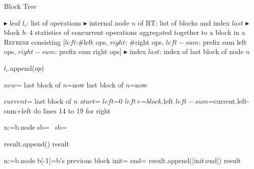 \documentclass[10pt,table]{article}
\theoremstyle{definition}
\begin{document}
\begin{algorithm}
\caption{Block Tree}
\begin{algorithmic}[1]
\begin{multicols}{2}


\Statex $\blacktriangleright$ leaf $l_i$: list of operations
\Statex $\blacktriangleright$ internal node $n$ of BT: list of blocks and index $last$
\Statex $\blacktriangleright$ block $b$: 4 statistics of concurrent operations aggregated together to a block in a \textsc{Refresh} consisting [$left$:$ \#$left ops, $right$: $\#$right ops, $left-sum$: prefix sum left ops, $right-sum$: prefix sum right ops]
\Statex $\blacktriangleright$ index $last$: index of last block of node $n$
\Statex

\State $l_i$.append($op$)
\State {}

\Statex

 \Return
\Else
\State $new$=
last block of $n$=now
last block of $n$=now
\EndIf
\EndIf
\State {}

\Statex

\State $current$= last block of $n$
\State $start$= 
\State $left$=0
\State $left$+=$block$.left
\EndFor
\State $left-sum$=current.left-sum+left
\State do lines 14 to 19 for right
\State {}

\columnbreak

\State n:=b.node
\State sb=
\State {} 
\Else ~sb=
\State {} \EndIf
{}

\Statex

\State result.append()
\EndFor
\State \Return result

\Statex

\State n:=b.node
\State b[-1]=b's previous block
\State init=
\State end=
\State result.append([init:end])
\EndFor
\State \Return result

\end{multicols}
\end{algorithmic}
\end{algorithm}



\end{document}

